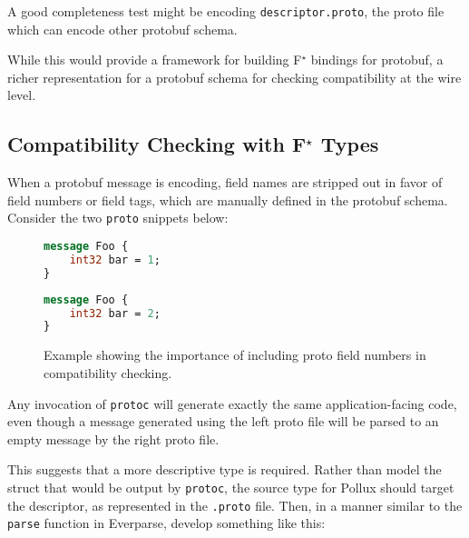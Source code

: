 \documentclass[11pt]{article}
\theoremstyle{definition}
\theoremstyle{plain}
\newcommand{\fstar}{F$^\star$}
\begin{document}
A good completeness test might be encoding \texttt{descriptor.proto}, the proto
file which can encode other protobuf schema.

While this would provide a framework for building \fstar{} bindings for
protobuf, a richer representation for a protobuf schema for checking
compatibility at the wire level.

\subsection{Compatibility Checking with \fstar{} Types}

When a protobuf message is encoding, field names are stripped out in favor of
field numbers or field tags, which are manually defined in the protobuf
schema. Consider the two \texttt{proto} snippets below:

\begin{figure}[H]
	\centering
	\begin{minipage}[bt]{0.4\textwidth}
		\begin{lstlisting}[language=proto]
message Foo {
    int32 bar = 1;
}\end{lstlisting}
	\end{minipage}
	\hspace{1cm}
	\begin{minipage}[bt]{0.4\textwidth}
		\begin{lstlisting}[language=proto]
message Foo {
    int32 bar = 2;
}\end{lstlisting}
	\end{minipage}

	\caption[]{Example showing the importance of including proto field numbers in
		compatibility checking.}
\end{figure}

Any invocation of \texttt{protoc} will generate exactly the same
application-facing code, even though a message generated using the left proto
file will be parsed to an empty message by the right proto file.

This suggests that a more descriptive type is required. Rather than model the
struct that would be output by \texttt{protoc}, the source type for Pollux
should target the descriptor, as represented in the \texttt{.proto} file. Then,
in a manner similar to the \texttt{parse} function in Everparse, develop
something like this:
\end{document}
